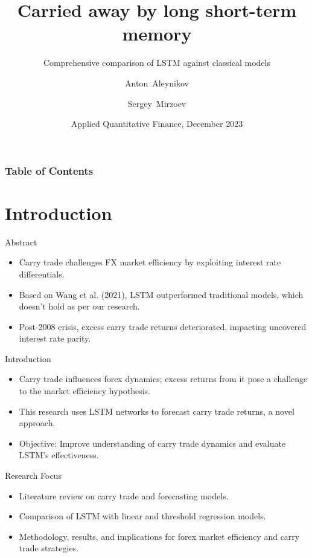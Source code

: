 \documentclass{beamer}
\title[LSTM vs Econometrics] %
{Carried away by long short-term memory}
\subtitle{Comprehensive comparison of LSTM against classical models}
\author[A.~Aleynikov \and S.~Mirzoev] %
{Anton~Aleynikov \and Sergey~Mirzoev}
\institute[ETH] %
{
  MSc Quantitative Finance\\
  ETH Zürich \& University of Zürich
}
\date[AQF 2023] %
{Applied Quantitative Finance, December 2023}
\begin{document}
\frame{\titlepage}


\begin{frame}
\frametitle{Table of Contents}
\tableofcontents
\end{frame}

\section{Introduction}

\begin{frame}{Abstract}
    \begin{itemize}
        \item Carry trade challenges FX market efficiency by exploiting interest rate differentials.
        \item Based on Wang et al. (2021), LSTM outperformed traditional models, which doesn't hold as per our research.
        \item Post-2008 crisis, excess carry trade returns deteriorated, impacting uncovered interest rate parity.
    \end{itemize}
\end{frame}

\begin{frame}{Introduction}
    \begin{itemize}
        \item Carry trade influences forex dynamics; excess returns from it pose a challenge to the market efficiency hypothesis.
        \item This research uses LSTM networks to forecast carry trade returns, a novel approach.
        \item Objective: Improve understanding of carry trade dynamics and evaluate LSTM's effectiveness.
    \end{itemize}
\end{frame}

\begin{frame}{Research Focus}
    \begin{itemize}
        \item Literature review on carry trade and forecasting models.
        \item Comparison of LSTM with linear and threshold regression models.
        \item Methodology, results, and implications for forex market efficiency and carry trade strategies.
    \end{itemize}
\end{frame}
\end{document}
